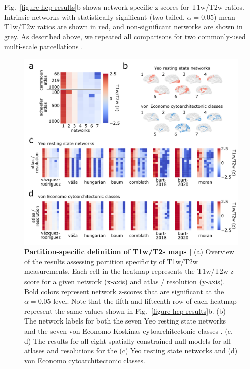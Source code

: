 \documentclass[12pt,aps,pra,reprint,showkeys]{revtex4-1}
\begin{document}
Fig.~\ref{figure-hcp-results}b shows network-specific z-scores for T1w/T2w ratios.
Intrinsic networks with statistically significant (two-tailed, $\alpha=0.05$) mean T1w/T2w ratios are shown in red, and non-significant networks are shown in grey.
As described above, we repeated all comparisons for two commonly-used multi-scale parcellations \citep{desikan2006automated, cammoun2012mapping, schaefer2018cercor}.


\begin{figure}[htp]
  \begin{center}
    \centerline{\includegraphics[width=\textwidth]{network-results.png}}
    \caption{
      \textbf{Partition-specific definition of T1w/T2s maps |}
      (a) Overview of the results assessing partition specificity of T1w/T2w measurements.
      Each cell in the heatmap represents the T1w/T2w z-score for a given network (x-axis) and atlas / resolution (y-axis).
      Bold colors represent network z-scores that are significant at the $\alpha = 0.05$ level.
      Note that the fifth and fifteenth row of each heatmap represent the same values shown in Fig.~\ref{figure-hcp-results}b.
      (b) The network labels for both the seven Yeo resting state networks \citep{yeo2011organization} and the seven von Economo-Koskinas cytoarchitectonic classes \citep{voneconomo1925cytoarchitecture, scholtens2018neuroimage}.
      (c, d) The results for all eight spatially-constrained null models for all atlases and resolutions for the (c) Yeo resting state networks and (d) von Economo cytoarchitectonic classes.
}
\end{center}
\end{figure}
\end{document}
